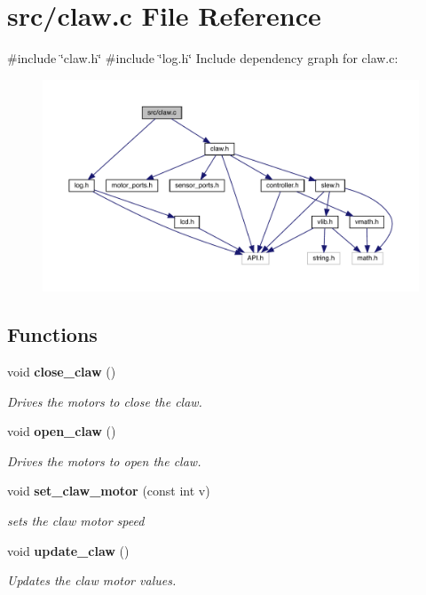 \section{src/claw.c File Reference}
\label{claw_8c}
{\ttfamily \#include \char`\"{}claw.\+h\char`\"{}}\newline
{\ttfamily \#include \char`\"{}log.\+h\char`\"{}}\newline
Include dependency graph for claw.\+c\+:
\nopagebreak
\begin{figure}[H]
\begin{center}
\leavevmode
\includegraphics[width=350pt]{claw_8c__incl}
\end{center}
\end{figure}
\subsection*{Functions}
\begin{DoxyCompactItemize}
\item 
void \textbf{ close\+\_\+claw} ()
\begin{DoxyCompactList}\small\item\em Drives the motors to close the claw. \end{DoxyCompactList}\item 
void \textbf{ open\+\_\+claw} ()
\begin{DoxyCompactList}\small\item\em Drives the motors to open the claw. \end{DoxyCompactList}\item 
void \textbf{ set\+\_\+claw\+\_\+motor} (const int v)
\begin{DoxyCompactList}\small\item\em sets the claw motor speed \end{DoxyCompactList}\item 
void \textbf{ update\+\_\+claw} ()
\begin{DoxyCompactList}\small\item\em Updates the claw motor values. \end{DoxyCompactList}\end{DoxyCompactItemize}
